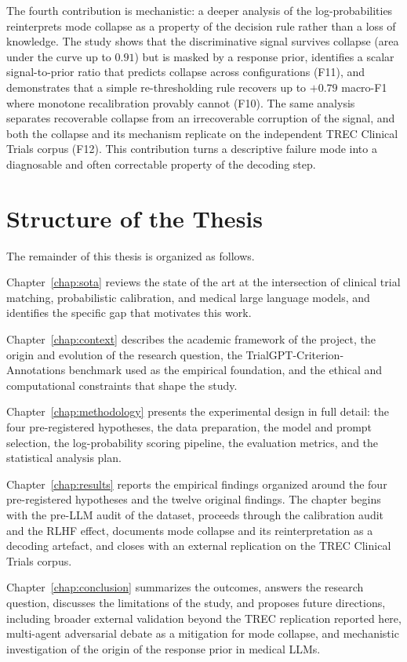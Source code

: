 The fourth contribution is mechanistic: a deeper analysis of the 
log-probabilities reinterprets mode collapse as a property of the 
decision rule rather than a loss of knowledge. The study shows that 
the discriminative signal survives collapse (area under the curve up 
to $0.91$) but is masked by a response prior, identifies a scalar 
signal-to-prior ratio that predicts collapse across configurations 
(F11), and demonstrates that a simple re-thresholding rule recovers up 
to $+0.79$ macro-F1 where monotone recalibration provably cannot (F10). 
The same analysis separates recoverable collapse from an irrecoverable 
corruption of the signal, and both the collapse and its mechanism 
replicate on the independent TREC Clinical Trials corpus (F12). This 
contribution turns a descriptive failure mode into a diagnosable and 
often correctable property of the decoding step.

\section{Structure of the Thesis}
\label{sec:intro-structure}

The remainder of this thesis is organized as follows.

Chapter~\ref{chap:sota} reviews the state of the art at the 
intersection of clinical trial matching, probabilistic calibration, 
and medical large language models, and identifies the specific gap 
that motivates this work.

Chapter~\ref{chap:context} describes the academic framework of the 
project, the origin and evolution of the research question, the 
TrialGPT-Criterion-Annotations benchmark used as the empirical 
foundation, and the ethical and computational constraints that shape 
the study.

Chapter~\ref{chap:methodology} presents the experimental design in 
full detail: the four pre-registered hypotheses, the data preparation, 
the model and prompt selection, the log-probability scoring pipeline, 
the evaluation metrics, and the statistical analysis plan.

Chapter~\ref{chap:results} reports the empirical findings organized 
around the four pre-registered hypotheses and the twelve original 
findings. The chapter begins with the pre-LLM audit of the dataset, 
proceeds through the calibration audit and the RLHF effect, documents 
mode collapse and its reinterpretation as a decoding artefact, and 
closes with an external replication on the TREC Clinical Trials corpus.

Chapter~\ref{chap:conclusion} summarizes the outcomes, answers the 
research question, discusses the limitations of the study, and 
proposes future directions, including broader external validation 
beyond the TREC replication reported here, multi-agent adversarial 
debate as a mitigation for mode collapse, and mechanistic 
investigation of the origin of the response prior in medical LLMs.